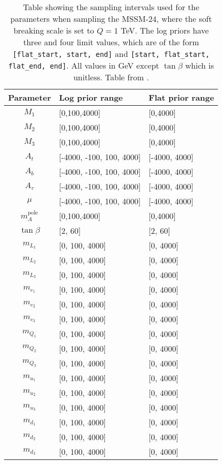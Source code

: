 \documentclass[twoside,english]{uiofysmaster}
\begin{document}
{{\begin{table}
\centering
\begin{tabular}{@{}cll@{}} \toprule
Parameter & Log prior range & Flat prior range\\ \midrule
$M_1$ & [0,100,4000] & [0,4000]\\
$M_2$ & [0,100,4000] & [0,4000]\\
$M_3$ & [0,100,4000] & [0,4000]\\
$A_t$ & [-4000, -100, 100, 4000] & [-4000, 4000]\\
$A_b$ & [-4000, -100, 100, 4000] & [-4000, 4000]\\
$A_{\tau}$ & [-4000, -100, 100, 4000] & [-4000, 4000]\\
$\mu$ & [-4000, -100, 100, 4000] & [-4000, 4000]\\
$m_A^{\text{pole}}$ & [0,100,4000] & [0,4000]\\
$\tan \beta$ & [2, 60] & [2, 60]\\
$m_{L_1}$ & [0, 100, 4000] & [0, 4000]\\
$m_{L_2}$ & [0, 100, 4000] & [0, 4000]\\
$m_{L_3}$ & [0, 100, 4000] & [0, 4000]\\
$m_{e_1}$ & [0, 100, 4000] & [0, 4000]\\
$m_{e_2}$ & [0, 100, 4000] & [0, 4000]\\
$m_{e_3}$ & [0, 100, 4000] & [0, 4000]\\
$m_{Q_1}$ & [0, 100, 4000] & [0, 4000]\\
$m_{Q_2}$ & [0, 100, 4000] & [0, 4000]\\
$m_{Q_3}$ & [0, 100, 4000] & [0, 4000]\\
$m_{u_1}$ & [0, 100, 4000] & [0, 4000]\\
$m_{u_2}$ & [0, 100, 4000] & [0, 4000]\\
$m_{u_3}$ & [0, 100, 4000] & [0, 4000]\\
$m_{d_1}$ & [0, 100, 4000] & [0, 4000]\\
$m_{d_2}$ & [0, 100, 4000] & [0, 4000]\\
$m_{d_3}$ & [0, 100, 4000] & [0, 4000]\\ \bottomrule
\end{tabular}
\caption{Table showing the sampling intervals used for the parameters when sampling the MSSM-24, where the soft breaking scale is set to $Q = 1$ TeV. The log priors have three and four limit values, which are of the form \texttt{[flat\_start, start, end]} and \texttt{[start, flat\_start, flat\_end, end]}. All values in GeV except $\tan \beta$ which is unitless. Table from \cite{sparre2018fast}.}
\label{Tab:: evaluating cross : Feature distributions }
\end{table}

}}
\end{document}

